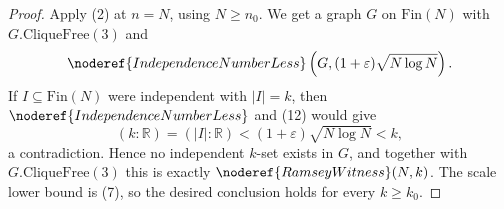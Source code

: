 \begin{proof}
Apply (2) at \(n=N\), using \(N\ge n_0\).  We get a graph \(G\) on
\(\mathrm{Fin}(N)\) with \(G.\mathrm{CliqueFree}(3)\) and
\[
\noderef{IndependenceNumberLess}
\left(G,(1+\varepsilon)\sqrt{N\log N}\right).
\]
If \(I\subseteq\mathrm{Fin}(N)\) were independent with \(|I|=k\), then
\(\noderef{IndependenceNumberLess}\) and (12) would give
\[
(k:\mathbb R)=(|I|:\mathbb R)
<(1+\varepsilon)\sqrt{N\log N}<k,
\]
a contradiction.  Hence no independent \(k\)-set exists in \(G\), and together
with \(G.\mathrm{CliqueFree}(3)\) this is exactly
\(\noderef{RamseyWitness}(N,k)\).  The scale lower bound is (7), so the desired
conclusion holds for every \(k\ge k_0\).
\end{proof}
